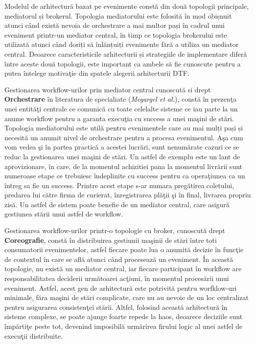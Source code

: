 Modelul de arhitectură bazat pe evenimente constă din două topologii principale, mediatorul și brokerul. Topologia mediatorului este folosită în mod obișnuit atunci când există nevoia de orchestrare a mai multor pași în cadrul unui eveniment printr-un mediator central, în timp ce topologia brokerului este utilizată atunci când doriți să înlănțuiți evenimente fără a utiliza un mediator central. Deoarece caracteristicile arhitecturii și strategiile de implementare diferă între aceste două topologii, este important ca ambele să fie cunoscute pentru a putea întelege motivaţie din spatele alegerii arhitecturii DTF. 

\par Gestionarea workflow-urilor prin mediator central cunoscută si drept \textbf{Orchestrare} în literatura de specialiate (\emph{Megargel et al.}\cite{megargel2021}), constă în prezenţa unei entităţi centrale ce comunică cu toate celelalte sisteme ce iau parte la un anume workflow pentru a garanta execuţia cu success a unei maşini de stări. Topologia mediatorului este utilă pentru evenimentele care au mai mulți pași și necesită un anumit nivel de orchestrare pentru a procesa evenimentul. Aşa cum vom vedea şi în partea practică a acestei lucrări, sunt nenumărate cazuri ce se reduc la gestionarea unei maşini de stări. Un astfel de exemplu este un lant de aprovizionare, în care, de la momentul achizitiei pana la momentul livrării sunt numeroase etape ce trebuiesc îndeplinite cu success pentru ca operaţiunea ca un întreg sa fie un success. Printre acest etape s-ar numara pregătirea coletului, predarea lui către firma de curierat, înregistrarea plăţii şi în final, livrarea propriu zisă. Un astfel de sistem poate benefie de un mediator central, care asigură gestiunea stării unui astfel de workflow. 
\par Gestionarea workflow-urilor printr-o topologie cu broker, cunoscută drept  \textbf{Coreografie}, constă în distribuirea gestiunii maşinii de stări între toti consumatorii evenimentelor, astfel fiecare poate lua o anumită decizie în funcţie de contextul în care se află atunci când procesează un eveniment. În această topologie, nu există un mediator central, iar fiecare participant în workflow are responsabilitatea deciderii următoarei acţiuni, în momentul procesării unui eveniment. Astfel, acest gen de arhitectură este potrivită pentru worfklow-uri minimale, făra maşini de stări complicate, care nu au nevoie de un loc centralizat pentru asigurarea consistenţei stării. Altfel, folosind această arhitectură în sisteme complexe, se poate ajunge foarte repede la haos, deoarece deciziile sunt împărtiţe peste tot, devenind imposibilă urmărirea firului logic al unei astfel de execuţii distribuite. 
